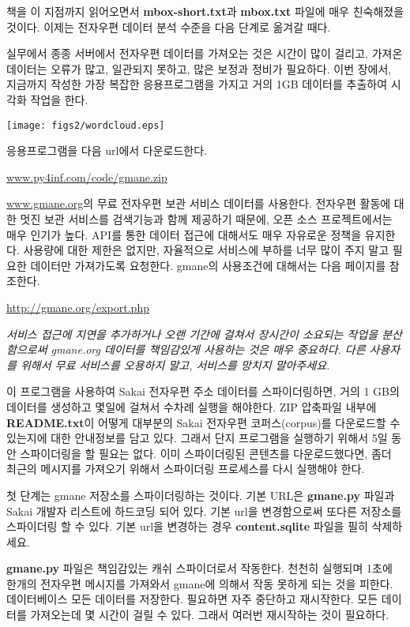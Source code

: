 책을 이 지점까지 읽어오면서 {\bf mbox-short.txt}과 {\bf mbox.txt} 파일에 매우 친숙해졌을 것이다.
이제는 전자우편 데이터 분석 수준을 다음 단계로 옮겨갈 때다.

실무에서 종종 서버에서 전자우편 데이터를 가져오는 것은 시간이 많이 걸리고, 가져온 데이터는 오류가 많고, 일관되지 못하고, 많은 보정과 정비가 필요하다.
이번 장에서, 지금까지 작성한 가장 복잡한 응용프로그램을 가지고 거의 1GB 데이터를 추출하여 시각화 작업을 한다.

\beforefig
\centerline{\texttt{[image: figs2/wordcloud.eps]}}
\afterfig

응용프로그램을 다음 url에서 다운로드한다.

\url{www.py4inf.com/code/gmane.zip}

\url{www.gmane.org}의 무료 전자우편 보관 서비스 데이터를 사용한다.
전자우편 활동에 대한 멋진 보관 서비스를 검색기능과 함께 제공하기 때문에, 오픈 소스 프로젝트에서는 매우 인기가 높다.
API를 통한 데이터 접근에 대해서도 매우 자유로운 정책을 유지한다.
사용량에 대한 제한은 없지만, 자율적으로 서비스에 부하를 너무 많이 주지 말고 필요한 데이터만 가져가도록 요청한다.
gmane의 사용조건에 대해서는 다음 페이지를 참조한다.

\url{http://gmane.org/export.php}

{\em 서비스 접근에 지연을 추가하거나 오랜 기간에 걸쳐서 장시간이 소요되는 작업을 분산함으로써
gmane.org 데이터를 책임감있게 사용하는 것은 매우 중요하다. 다른 사용자를 위해서 무료 서비스를 오용하지 말고, 
서비스를 망치지 말아주세요.}

이 프로그램을 사용하여 Sakai 전자우편 주소 데이터를 스파이더링하면, 거의 1 GB의 데이터를 생성하고 몇일에 걸쳐서 수차례 실행을 해야한다. 
ZIP 압축파일 내부에 {\bf README.txt}이 어떻게 대부분의 Sakai 전자우편 코퍼스(corpus)를 다운로드할 수 있는지에 대한 안내정보를 담고 있다.
그래서 단지 프로그램을 실행하기 위해서 5일 동안 스파이더링을 할 필요는 없다. 
이미 스파이더링된 콘텐츠를 다운로드했다면, 좀더 최근의 메시지를 가져오기 위해서 스파이더링 프로세스를 다시 실행해야 한다.

첫 단계는 gmane 저장소를 스파이더링하는 것이다. 
기본 URL은 {\bf gmane.py} 파일과 Sakai 개발자 리스트에 하드코딩 되어 있다. 
기본 url을 변경함으로써 또다른 저장소를 스파이더링 할 수 있다.
기본 url을 변경하는 경우 {\bf content.sqlite} 파일을 필히 삭제하세요.

{\bf gmane.py} 파일은 책임감있는 캐쉬 스파이더로서 작동한다. 
천천히 실행되며 1초에 한개의 전자우편 메시지를 가져와서 gmane에 의해서 작동 못하게 되는 것을 피한다.
데이터베이스 모든 데이터를 저장한다. 
필요하면 자주 중단하고 재시작한다.
모든 데이터를 가져오는데 몇 시간이 걸릴 수 있다. 
그래서 여러번 재시작하는 것이 필요하다. 

